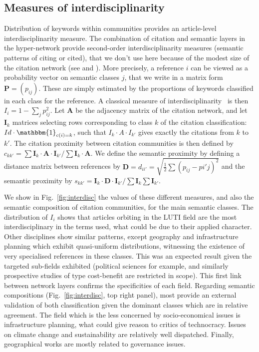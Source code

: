 \documentclass[10pt]{article}
\begin{document}
\subsection{Measures of interdisciplinarity}

Distribution of keywords within communities provides an article-level interdisciplinarity measure. The combination of citation and semantic layers in the hyper-network provide second-order interdisciplinarity measures (semantic patterns of citing or cited), that we don't use here because of the modest size of the citation network (see \cite{raimbault2019exploration} and \cite{bergeaud2017classifying}). More precisely, a reference $i$ can be viewed as a probability vector on semantic classes $j$, that we write in a matrix form $\mathbf{P}=(p_{ij})$. These are simply estimated by the proportions of keywords classified in each class for the reference. A classical measure of interdisciplinarity~\cite{bergeaud2017classifying} is then $I_i = 1 - \sum_j p_{ij}^2$. Let $\mathbf{A}$ be the adjacency matrix of the citation network, and let $\mathbf{I}_k$ matrices selecting rows corresponding to class $k$ of the citation classification: $Id\cdot \mathbbm{1}_{c(i)=k}$, such that $I_k \cdot A \cdot I_{k'}$ gives exactly the citations from $k$ to $k'$. The citation proximity between citation communities is then defined by $c_{kk'} = \sum \mathbf{I}_k \cdot \mathbf{A} \cdot \mathbf{I}_{k'} /  \sum \mathbf{I}_k \cdot \mathbf{A}$. We define the semantic proximity by defining a distance matrix between references by $\mathbf{D} = d_{ii'}=\sqrt{\frac{1}{2}\sum (p_{ij}-p{i'j})^2}$ and the semantic proximity by $s_{kk'} = \mathbf{I}_k \cdot \mathbf{D} \cdot \mathbf{I}_{k'} / \sum \mathbf{I}_k \sum \mathbf{I}_{k'}$.


We show in Fig.~\ref{fig:interdisc} the values of these different measures, and also the semantic composition of citation communities, for the main semantic classes. The distribution of $I_i$ shows that articles orbiting in the LUTI field are the most interdisciplinary in the terms used, what could be due to their applied character. Other disciplines show similar patterns, except geography and infrastructure planning which exhibit quasi-uniform distributions, witnessing the existence of very specialised references in these classes. This was an expected result given the targeted sub-fields exhibited (political sciences for example, and similarly prospective studies of type cost-benefit are restricted in scope). This first link between network layers confirms the specificities of each field. Regarding semantic compositions (Fig.~\ref{fig:interdisc}, top right panel), most provide an external validation of both classification given the dominant classes which are in relative agreement. The field which is the less concerned by socio-economical issues is infrastructure planning, what could give reason to critics of technocracy. Issues on climate change and sustainability are relatively well dispatched. Finally, geographical works are mostly related to governance issues.
\end{document}
